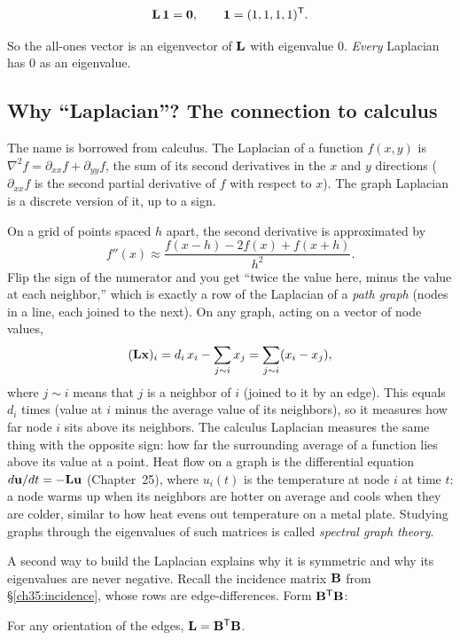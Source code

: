 \[
\mathbf{L}\,\mathbf{1} = \mathbf{0}, \qquad \mathbf{1} = (1,1,1,1)^{\mathsf{T}}.
\]

So the all-ones vector is an eigenvector of $\mathbf{L}$ with eigenvalue $0$. \emph{Every}
Laplacian has $0$ as an eigenvalue.

\subsection{Why ``Laplacian''? The connection to calculus}

The name is borrowed from calculus. The Laplacian of a function $f(x,y)$ is
$\nabla^2 f = \partial_{xx} f + \partial_{yy} f$, the sum of its second derivatives in the
$x$ and $y$ directions ($\partial_{xx} f$ is the second partial derivative of $f$ with
respect to $x$). The graph Laplacian is a discrete version of it, up to a sign.

\begin{connectionbox}
On a grid of points spaced $h$ apart, the second derivative is approximated by
\[
f''(x) \approx \frac{f(x-h) - 2f(x) + f(x+h)}{h^2}.
\]
Flip the sign of the numerator and you get ``twice the value here, minus the value at each
neighbor,'' which is exactly a row of the Laplacian of a \emph{path graph} (nodes in a
line, each joined to the next). On any graph, acting on a vector of node values,
\[
(\mathbf{L}\mathbf{x})_i = d_i\, x_i - \sum_{j \sim i} x_j = \sum_{j \sim i} (x_i - x_j),
\]
where $j \sim i$ means that $j$ is a neighbor of $i$ (joined to it by an edge). This equals
$d_i$ times (value at $i$ minus the average value of its neighbors), so it measures how far
node $i$ sits above its neighbors. The calculus Laplacian measures the same thing with the
opposite sign: how far the surrounding average of a function lies above its value at a
point. Heat flow on a graph is the differential equation $d\mathbf{u}/dt = -\mathbf{L}\mathbf{u}$
(Chapter~25), where $u_i(t)$ is the temperature at node $i$ at time $t$: a node warms up when
its neighbors are hotter on average and cools when they are colder, similar to how heat evens out
temperature on a metal plate. Studying graphs through the eigenvalues of such matrices is
called \emph{spectral graph theory}.
\end{connectionbox}

A second way to build the Laplacian explains why it is symmetric and why its eigenvalues
are never negative. Recall the incidence matrix $\mathbf{B}$ from
\S\ref{ch35:incidence}, whose rows are edge-differences. Form $\mathbf{B}^{\mathsf{T}} \mathbf{B}$:

\begin{theorem}
\label{ch35:thm-btb}
For any orientation of the edges, $\mathbf{L} = \mathbf{B}^{\mathsf{T}} \mathbf{B}$.
\end{theorem}

